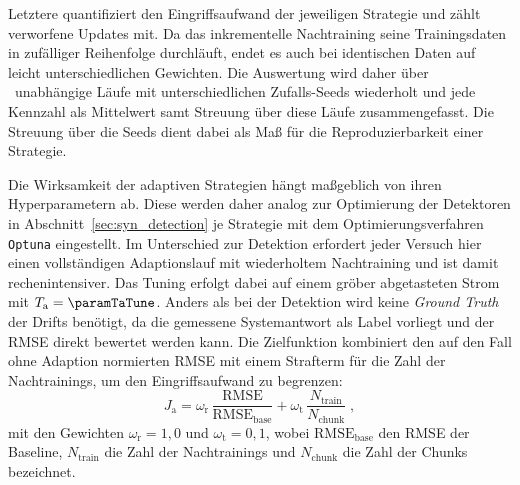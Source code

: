 Letztere quantifiziert den Eingriffsaufwand der jeweiligen Strategie und zählt verworfene Updates mit. Da das inkrementelle Nachtraining seine Trainingsdaten in zufälliger Reihenfolge durchläuft, endet es auch bei identischen Daten auf leicht unterschiedlichen Gewichten. Die Auswertung wird daher über \adaptNSeeds\ unabhängige Läufe mit unterschiedlichen Zufalls-Seeds wiederholt und jede Kennzahl als Mittelwert samt Streuung über diese Läufe zusammengefasst. Die Streuung über die Seeds dient dabei als Maß für die Reproduzierbarkeit einer Strategie. \par
%
Die Wirksamkeit der adaptiven Strategien hängt maßgeblich von ihren Hyperparametern ab. Diese werden daher analog zur Optimierung der Detektoren in Abschnitt~\ref{sec:syn_detection} je Strategie mit dem Optimierungsverfahren \texttt{Optuna} eingestellt. Im Unterschied zur Detektion erfordert jeder Versuch hier einen vollständigen Adaptionslauf mit wiederholtem Nachtraining und ist damit rechenintensiver. Das Tuning erfolgt dabei auf einem gröber abgetasteten Strom mit $T_{\mathrm{a}} = \paramTaTune$. Anders als bei der Detektion wird keine \emph{Ground Truth} der Drifts benötigt, da die gemessene Systemantwort als Label vorliegt und der \ac{RMSE} direkt bewertet werden kann. Die Zielfunktion kombiniert den auf den Fall ohne Adaption normierten \ac{RMSE} mit einem Strafterm für die Zahl der Nachtrainings, um den Eingriffsaufwand zu begrenzen:
%
\begin{equation}
    J_{\mathrm{a}} = \omega_{\mathrm{r}} \, \frac{\mathrm{RMSE}}{\mathrm{RMSE}_{\mathrm{base}}}
    + \omega_{\mathrm{t}} \, \frac{N_{\mathrm{train}}}{N_{\mathrm{chunk}}} \; ,
    \label{eq:adaption_score}
\end{equation}
%
mit den Gewichten $\omega_{\mathrm{r}} = 1{,}0$ und $\omega_{\mathrm{t}} = 0{,}1$, wobei $\mathrm{RMSE}_{\mathrm{base}}$ den \ac{RMSE} der Baseline, $N_{\mathrm{train}}$ die Zahl der Nachtrainings und $N_{\mathrm{chunk}}$ die Zahl der Chunks bezeichnet. 

